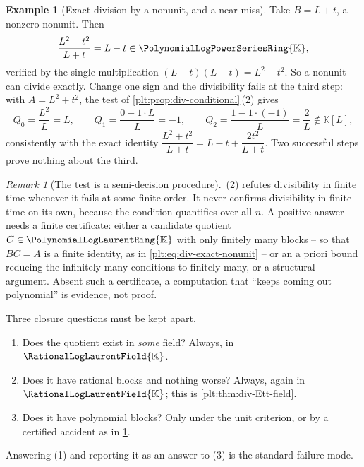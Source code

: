 \documentclass[11pt,oneside]{article}
\theoremstyle{plain}
\theoremstyle{definition}
\newtheorem{example}[theorem]{Example}
\theoremstyle{remark}
\newtheorem{remark}[theorem]{Remark}
\newcommand{\K}{\mathbb{K}}
\newcommand{\PLpow}{\PolynomialLogPowerSeriesRing{\K}}   %
\newcommand{\PLlau}{\PolynomialLogLaurentRing{\K}}       %
\newcommand{\PLrat}{\RationalLogLaurentField{\K}}        %
\begin{document}
\begin{example}[Exact division by a nonunit, and a near miss]
\label{plt:ex:div-conditional}
Take \(B=L+t\), a nonzero nonunit.  Then
\begin{equation}\label{plt:eq:div-exact-nonunit}
  \frac{L^{2}-t^{2}}{L+t}=L-t\in\PLpow ,
\end{equation}
verified by the single multiplication \((L+t)(L-t)=L^{2}-t^{2}\).  So a nonunit
can divide exactly.  Change one sign and the divisibility fails at the third
step: with \(A=L^{2}+t^{2}\), the test of
\cref{plt:prop:div-conditional}\,(2) gives
\[
  Q_{0}=\frac{L^{2}}{L}=L,\qquad
  Q_{1}=\frac{0-1\cdot L}{L}=-1,\qquad
  Q_{2}=\frac{1-1\cdot(-1)}{L}=\frac2L\notin\K[L],
\]
consistently with the exact identity
\(\dfrac{L^{2}+t^{2}}{L+t}=L-t+\dfrac{2t^{2}}{L+t}\).  Two successful steps
prove nothing about the third.
\end{example}

\begin{remark}[The test is a semi-decision procedure]
\label{plt:rmk:div-semidecision}
\,(2) refutes divisibility in finite time
whenever it fails at some finite order.  It never confirms divisibility in
finite time on its own, because the condition quantifies over all \(n\).
A positive answer needs a finite certificate: either a candidate quotient
\(C\in\PLlau\) with only finitely many blocks -- so that \(BC=A\) is a finite
identity, as in \cref{plt:eq:div-exact-nonunit} -- or an a priori bound
reducing the infinitely many conditions to finitely many, or a structural
argument.  Absent such a certificate, a computation that ``keeps coming out
polynomial'' is evidence, not proof.
\end{remark}

\begin{checkpointbox}
Three closure questions must be kept apart.
\begin{enumerate}
\item Does the quotient exist in \emph{some} field?  Always, in \(\PLrat\).
\item Does it have rational blocks and nothing worse?  Always, again in
      \(\PLrat\); this is \cref{plt:thm:div-Ett-field}.
\item Does it have polynomial blocks?  Only under the unit criterion, or by a
      certified accident as in \cref{plt:ex:div-conditional}.
\end{enumerate}
Answering (1) and reporting it as an answer to (3) is the standard failure
mode.
\end{checkpointbox}
\end{document}
